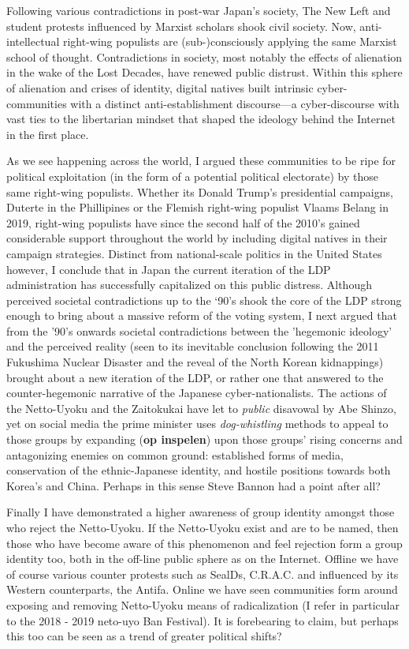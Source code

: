 \documentclass[10pt,british,A4paper,,openany]{memoir}
\begin{document}
Following various contradictions in post-war Japan's society, The New
Left and student protests influenced by Marxist scholars shook civil
society. Now, anti-intellectual right-wing populists are
(sub-)consciously applying the same Marxist school of thought.
Contradictions in society, most notably the effects of alienation in the
wake of the Lost Decades, have renewed public distrust. Within this
sphere of alienation and crises of identity, digital natives built
intrinsic cyber-communities with a distinct anti-establishment
discourse---a cyber-discourse with vast ties to the libertarian mindset
that shaped the ideology behind the Internet in the first place.

As we see happening across the world, I argued these communities to be
ripe for political exploitation (in the form of a potential political
electorate) by those same right-wing populists. Whether its Donald
Trump's presidential campaigns, Duterte in the Phillipines or the
Flemish right-wing populist Vlaams Belang in 2019, right-wing populists
have since the second half of the 2010's gained considerable support
throughout the world by including digital natives in their campaign
strategies. Distinct from national-scale politics in the United States
however, I conclude that in Japan the current iteration of the LDP
administration has successfully capitalized on this public distress.
Although perceived societal contradictions up to the `90's shook the
core of the LDP strong enough to bring about a massive reform of the
voting system, I next argued that from the '90's onwards societal
contradictions between the 'hegemonic ideology' and the perceived
reality (seen to its inevitable conclusion following the 2011 Fukushima
Nuclear Disaster and the reveal of the North Korean kidnappings) brought
about a new iteration of the LDP, or rather one that answered to the
counter-hegemonic narrative of the Japanese cyber-nationalists. The
actions of the Netto-Uyoku and the Zaitokukai have let to \emph{public}
disavowal by Abe Shinzo, yet on social media the prime minister uses
\emph{dog-whistling} methods to appeal to those groups by expanding
(\textbf{op inspelen}) upon those groups' rising concerns and
antagonizing enemies on common ground: established forms of media,
conservation of the ethnic-Japanese identity, and hostile positions
towards both Korea's and China. Perhaps in this sense Steve Bannon had a
point after all?

Finally I have demonstrated a higher awareness of group identity amongst
those who reject the Netto-Uyoku. If the Netto-Uyoku exist and are to be
named, then those who have become aware of this phenomenon and feel
rejection form a group identity too, both in the off-line public sphere
as on the Internet. Offline we have of course various counter protests
such as SealDs, C.R.A.C. and influenced by its Western counterparts, the
Antifa. Online we have seen communities form around exposing and
removing Netto-Uyoku means of radicalization (I refer in particular to
the 2018 - 2019 neto-uyo Ban Festival). It is forebearing to claim, but
perhaps this too can be seen as a trend of greater political shifts?
\end{document}
